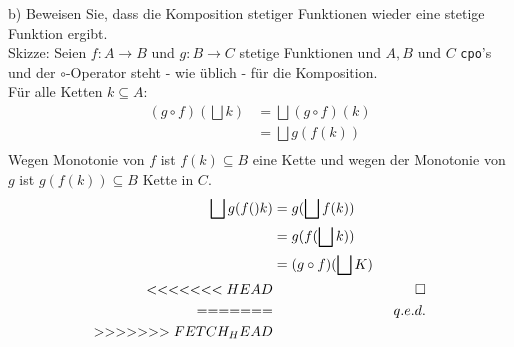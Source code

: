 \documentclass[ngerman,a4paper]{report}
\begin{document}
\begin{compactenum}
\item[b)] Beweisen Sie, dass die Komposition stetiger Funktionen wieder eine stetige Funktion ergibt.\\
Skizze: Seien $f : A \rightarrow B$ und $g : B \rightarrow C$ stetige Funktionen und $A, B$ und $C$ \lstinline!cpo!'s und der $\circ$-Operator steht - wie üblich - für die Komposition.\\
Für alle Ketten $k \subseteq A$:
\begin{align*}
(g \circ f) (\bigsqcup k) &= \bigsqcup (g \circ f) (k) \\
&= \bigsqcup g (f (k)) \\
\end{align*}
Wegen Monotonie von $f$ ist $f(k) \subseteq B$ eine Kette und wegen der Monotonie von $g$ ist $g(f(k)) \subseteq B$ Kette in $C$.
\begin{align*}
\bigsqcup g (f()k) &= g (\bigsqcup f(k))\\
&= g (f (\bigsqcup k))\\
&= (g \circ f) (\bigsqcup K)\\
<<<<<<< HEAD
&& \qed\\
=======
&& q.e.d.\\
>>>>>>> FETCH_HEAD
\end{align*}
\end{compactenum}
\end{document}
